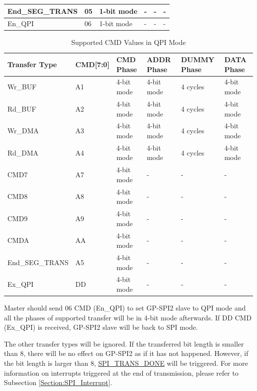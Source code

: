 \documentclass[main\_\_EN.tex]{subfiles}
\begin{document}
\begin{longtable}[c]{ |L{2.6cm}|L{1.8cm}|L{1.9cm}|L{1.9cm}|L{1.9cm}|L{1.9cm}| }
    End\_SEG\_TRANS        & \hexprefix{}05 & 1-bit mode & - & - & - \\
    \hline
    En\_QPI                & \hexprefix{}06 & 1-bit mode & - & - & - \\
    \hline

\end{longtable}


\begin{longtable}[c]{ |L{3cm}|L{1.8cm}|L{1.8cm}|L{1.8cm}|L{1.8cm}|L{1.8cm}| }
\caption{Supported CMD Values in QPI Mode}
\label{table:SPI_slave_CMD_QPI}\\\hline
{}
    Transfer Type & CMD[7:0] &  CMD Phase & ADDR Phase & DUMMY Phase   & DATA Phase\\
    \hline
    Wr\_BUF       & \hexprefix{}A1       & 4-bit mode & 4-bit mode & 4 cycles & 4-bit mode \\
    \hline
    Rd\_BUF       & \hexprefix{}A2       & 4-bit mode & 4-bit mode & 4 cycles & 4-bit mode \\
    \hline
    Wr\_DMA       & \hexprefix{}A3       & 4-bit mode & 4-bit mode & 4 cycles & 4-bit mode \\
    \hline
    Rd\_DMA       & \hexprefix{}A4       & 4-bit mode & 4-bit mode & 4 cycles & 4-bit mode \\
    \hline

    CMD7          & \hexprefix{}A7       & 4-bit mode & - & - & - \\
    \hline
    CMD8          & \hexprefix{}A8       & 4-bit mode & - & - & - \\
    \hline
    CMD9          & \hexprefix{}A9       & 4-bit mode & - & - & - \\
    \hline
    CMDA          & \hexprefix{}AA       & 4-bit mode & - & - & - \\
    \hline

    End\_SEG\_TRANS  & \hexprefix{}A5    & 4-bit mode & - & - & - \\
    \hline
    Ex\_QPI          & \hexprefix{}DD    & 4-bit mode & - & - & - \\
    \hline
\end{longtable}


Master should send \hexprefix{}06 CMD (En\_QPI) to set GP-SPI2 slave to QPI mode and all the phases of supported transfer will be in 4-bit mode afterwards. If \hexprefix{}DD CMD (Ex\_QPI) is received, GP-SPI2 slave will be back to SPI mode.

The other transfer types will be ignored. If the transferred bit length is smaller than 8, there will be no effect on GP-SPI2 as if it has not happened. However, if the bit length is larger than 8, \hyperref[fielddesc:SPITRANSDONE]{SPI\_TRANS\_DONE} will be triggered. For more information on interrupts triggered at the end of transmission, please refer to Subsection \ref{Section:SPI_Interrupt}.
\end{document}
